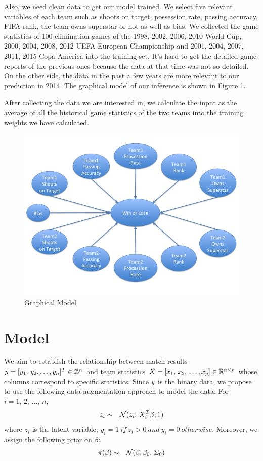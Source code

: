 \documentclass{article}
\begin{document}
Also, we need clean data to get our model trained. We select five relevant variables of each team such as shoots on target, possession rate, passing accuracy, FIFA rank, the team owns superstar or not as well as bias. We collected the game statistics of 100 elimination games of the 1998, 2002, 2006, 2010 World Cup, 2000, 2004, 2008, 2012 UEFA European Championship and 2001, 2004, 2007, 2011, 2015 Copa America into the training set. It's hard to get the detailed game reports of the previous ones because the data at that time was not so detailed. On the other side, the data in the past a few years are more relevant to our prediction in 2014. The graphical model of our inference is shown in Figure 1.

After collecting the data we are interested in, we calculate the input as the average of all the historical game statistics of the two teams into the training weights we have calculated.

\begin{figure}[H]
\centering
\includegraphics[width=0.9\linewidth]{graph.jpg}
\caption{Graphical Model}
\label{fig:pred}
\end{figure}

\section{Model}

We aim to establish the relationship between match results $\boldmath{y} = [y_1, \, y_2, \ldots, y_n]^T \in \mathbb{Z}^n$ and team statistics $\boldmath{X} = [\boldmath{x}_1, \, \boldmath{x}_2, \, \ldots, \boldmath{x}_p ] \in \mathbb{R}^{n \times p}$ whose columns correspond to specific statistics. Since $\boldmath{y}$ is the binary data, we propose to use the following data augmentation approach to model the data: For $i = 1, \, 2, \, \ldots, \, n$, 
\begin{eqnarray}
z_i &\sim& \mathcal{N} (z_i; \, X_i^T \boldmath{\beta}, 1)
\end{eqnarray}
where $z_i$ is the latent variable; $y_i=1 \ if \ z_i>0 \ and \ y_i=0 \ otherwise.$
Moreover, we assign the following prior on $\mathbb{\beta}$:
\begin{eqnarray}
\pi (\boldmath{\beta}) &\sim& \mathcal{N} (\boldmath{\beta}; \boldmath{\beta}_0, \, \Sigma_0 )
\end{eqnarray}
\end{document}
